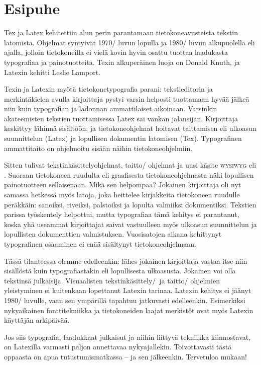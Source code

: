 
\chapter{Esipuhe}

Tex ja Latex kehitettiin alun perin parantamaan tietokoneavusteista
tekstin latomista. Ohjelmat syntyivät 1970\-/ luvun lopulla ja 1980\-/
luvun alkupuolella eli ajalla, jolloin tietokoneilla ei vielä kovin
hyvin osattu tuottaa laadukasta typografiaa ja painotuotteita. Texin
alkuperäinen luoja on Donald Knuth, ja Latexin kehitti Leslie Lamport.

Texin ja Latexin myötä tietokonetypografia parani: tekstieditorin ja
merkintäkielen avulla kirjoittaja pystyi varsin helposti tuottamaan
hyvää jälkeä niin kuin typografian ja ladonnan ammattilaiset aikoinaan.
Varsinkin akateemisten tekstien tuottamisessa Latex sai vankan
jalansijan. Kirjoittaja keskittyy lähinnä sisältöön, ja
tietokoneohjelmat hoitavat taittamisen eli ulkoasun suunnittelun (Latex)
ja lopullisen dokumentin latomisen (Tex). Typografinen ammattitaito on
ohjelmoitu sisään näihin tietokoneohjelmiin.

Sitten tulivat tekstinkäsittelyohjelmat, taitto\-/ ohjelmat ja uusi
käsite \textsc{wy\-si\-wyg} eli . Suoraan tietokoneen ruudulta eli graafisesta tietokoneohjelmasta
näki lopullisen painotuotteen sellaisenaan. Mikä sen helpompaa? Jokainen
kirjoittaja oli nyt samassa hetkessä myös latoja, joka heittelee
kirjakkeita tietokoneen ruudulle peräkkäin: sanoiksi, riveiksi,
palstoiksi ja lopulta valmiiksi dokumentiksi. Tekstien parissa
työskentely helpottui, mutta typografiaa tämä kehitys ei parantanut,
koska yhä useammat kirjoittajat saivat vastuulleen myös ulkoasun
suunnittelun ja lopullisten dokumenttien valmistuksen. Vuosisatojen
aikana kehittynyt typografinen osaaminen ei enää sisältynyt
tietokoneohjelmaan.

Tässä tilanteessa olemme edelleenkin: lähes jokainen kirjoittaja vastaa
itse niin sisällöstä kuin typografiastakin eli lopullisesta ulkoasusta.
Jokainen voi olla tekstinsä julkaisija. Visuaalisten
tekstinkäsittely\-/\ ja taitto\-/ ohjelmien yleistyminen ei kuitenkaan
lopettanut Latexin tarinaa. Latexin kehitys ei jäänyt 1980\-/ luvulle,
vaan sen ympärillä tapahtuu jatkuvasti edelleenkin. Esimerkiksi
nykyaikainen fonttitekniikka ja tietokoneiden laajat merkistöt ovat myös
Latexin käyttäjän arkipäivää.

Jos siis typografia, laadukkaat julkaisut ja niihin liittyvä tekniikka
kiinnostavat, on Latexilla varmasti paljon annettavaa nykyajallekin.
Toivottavasti tästä oppaasta on apua tutustumismatkassa -- ja sen
jälkeenkin. Tervetuloa mukaan!
